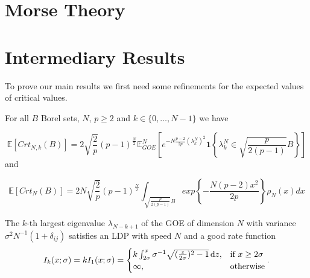 \section{Morse Theory}

\section{Intermediary Results}
To prove our main results we first need some refinements for the expected values of critical values.

\begin{theorem}
	For all $B$ Borel sets, $N$, $p\geq 2$ and $k\in\{0,\dots,N-1\}$ we have

	\begin{equation}\label{thm:2.1}
		\mathbb E[Crt_{N,k}(B)]=2\sqrt{\frac{2}{p}}(p-1)^{\frac{N}{2}}\mathbb E_{GOE}^N\left[e^{-N\frac{p-2}{2p}(\lambda_k^N)^2}\bm 1\left\{\lambda_k^N\in\sqrt{\frac{p}{2(p-1)}}B \right\}\right]
	\end{equation} and
	
	\begin{equation}\label{thm:2.2}
		\mathbb E[Crt_N(B)]=2N\sqrt{\frac{2}{p}}(p-1)^{\frac{N}{2}}\int_{\sqrt{\frac{p}{2(p-1)}}B}exp\left\{-\frac{N(p-2)x^2}{2p}\right\}\rho_N(x)dx
	\end{equation}
\end{theorem}

\begin{theorem}
	The $k$-th largest eigenvalue $\lambda_{N-k+1}$ of the GOE of dimension $N$ with variance $\sigma^2 N^{-1}(1+\delta_{ij})$ satisfies an LDP with speed $N$ and a good rate function
	\begin{equation}\label{thm:A.1}
		I_k(x;\sigma)=k I_1(x;\sigma)=\begin{cases}
						k\int_{2\sigma}^x \sigma^{-1}\sqrt{(\frac{z}{2\sigma})^2-1}\mathop{}\!\mathrm{d} z, &\mbox{if } x\geq 2\sigma \\
						\infty, &\mbox{otherwise}
					  \end{cases}.
	\end{equation}
\end{theorem}









